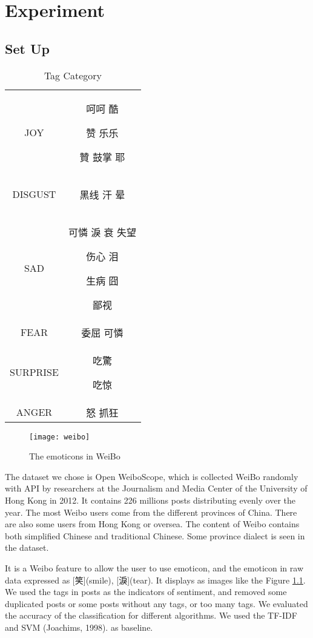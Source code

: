 \chapter{Experiment}

\section{Set Up}

\begin{table}[]
\centering
\caption{Tag Category}
\label{CategoryTable}
\begin{tabular}{|c|c|}
\hline
JOY  & 呵呵 酷 \begin{CJK}{UTF8}{gbsn}赞 乐乐\end{CJK} 贊 鼓掌 耶 \\
DISGUST & \begin{CJK}{UTF8}{gbsn}黑线 汗 晕\end{CJK} \\
SAD &   可憐 淚 衰 失望 \begin{CJK}{UTF8}{gbsn}伤心 泪\end{CJK} 生病 囧 \begin{CJK}{UTF8}{gbsn}鄙视\end{CJK}  \\
FEAR &  委屈  可憐 \\
SURPRISE &  吃驚  \begin{CJK}{UTF8}{gbsn}吃惊\end{CJK} \\
ANGER & 怒 抓狂 \\
\hline
\end{tabular}
\end{table}

\begin{figure}[h]
    \centering
	\texttt{[image: weibo]}
    \caption{The emoticons in WeiBo}
    \label{fig:weibo}
\end{figure}

The dataset we chose is Open WeiboScope\cite{fu2013reality}, which is collected WeiBo randomly with API by researchers at the Journalism and Media Center of the University of Hong Kong in 2012. 
It contains 226 millions posts distributing evenly over the year.  
The most Weibo users come from the different provinces of China. There are also some users from Hong Kong or oversea. 
The content of Weibo contains both simplified Chinese and traditional Chinese. Some province dialect is seen in the dataset.

It is a Weibo feature to allow the user to use emoticon, 
and the emoticon in raw data expressed as [笑](smile), [淚](tear). It displays as images like the Figure \ref{fig:weibo}. 
We used the tags in posts as the indicators of sentiment, and removed some duplicated posts or some posts without any tags, or too many tags. 
We evaluated the accuracy of the classification for different algorithms. We used the TF-IDF and SVM (Joachims, 1998). as baseline.

